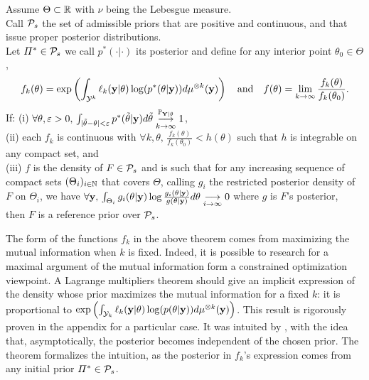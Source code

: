 \begin{thm}\label{thm:intro-ref:explicitRP}
    Assume $\Theta\subset\RR$ with $\nu$ being the Lebesgue measure.\\
    Call $\cP_s$ the set of admissible priors that are positive and continuous, and that issue proper posterior distributions.\\
    Let $\varPi^\ast\in\cP_s$ we call $p^\ast(\cdot|\cdot)$ its posterior and define for any interior point $\theta_0\in\Theta$,
        \begin{equation}
                f_k(\theta) = \exp\left(\int_{\cY^k}\ell_k(\mbf y|\theta)\log(p^\ast(\theta|\mbf y)) d\mu^{\otimes k}(\mbf y) \right) \quad\text{and}\quad  %
                f(\theta) = \lim_{k\rightarrow\infty}\frac{f_k(\theta)}{f_k(\theta_0)}.
        \end{equation}
    If: (i) $ \forall \theta,\eps>0,\,\int_{|\tilde\theta-\theta|<\eps} p^\ast(\tilde\theta|\mbf y)d\tilde\theta \conv[\PP_{\mbf Y|\theta}]{k\rightarrow\infty}1$,\\ (ii) each $f_k$ is continuous with $\forall k,\theta,\, \frac{f_k(\theta)}{f_k(\theta_0)} <h(\theta)$ such that $h$ is integrable on any compact set, and\\
    (iii) $f$ is the density of $F\in\cP_s$  and is such that for any increasing sequence of compact sets $(\Theta_i)_{i\in\NN}$ that covers $\Theta$, calling $g_i$ the restricted posterior density of $F$ on $\Theta_i$, we have $\forall \mbf y,\, \int_{\Theta_i}g_i(\theta|\mbf y)\log\frac{g_i(\theta|\mbf y)}{g(\theta|\mbf y)}d\theta \conv{i\rightarrow\infty}0$ where $g$ is $F$'s posterior,\\
    then $F$ is a reference prior over $\cP_s$.
 \end{thm}

 {
The form of the functions $f_k$ in the above theorem comes from maximizing the mutual information when $k$ is fixed. Indeed, it is possible to research for a maximal argument of the mutual information
form a constrained optimization viewpoint. A Lagrange multipliers theorem should give
an implicit expression of the density whose prior maximizes the mutual information for a fixed $k$: it is
proportional to 
    $\exp\left(\int_{\cY_k}\ell_k(\mbf y|\theta)\log(p(\theta|\mbf y) ) d\mu^{\otimes k}(\mbf y)\right)$. 
This result is rigorously proven in the appendix for a particular case. 
It was intuited by \citet{bernardo_bayesian_1994}, with the idea that, asymptotically, the posterior becomes independent of the chosen prior. The theorem formalizes the intuition, as the posterior in $f_k$'s expression comes from any initial prior $\varPi^\ast\in\cP_s$.
}
%


